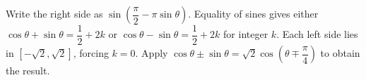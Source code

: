 Write the right side as $\sin (\dfrac{\pi}{2} - \pi \sin \theta)$. Equality of sines gives either $\cos \theta + \sin \theta = \dfrac{1}{2} + 2 k$ or $\cos \theta - \sin \theta = \dfrac{1}{2} + 2 k$ for integer $k$. Each left side lies in $[-\sqrt2,\sqrt2]$, forcing $k=0$. Apply $\cos \theta \pm \sin \theta = \sqrt{2} \cos (\theta \mp \dfrac{\pi}{4})$ to obtain the result.
